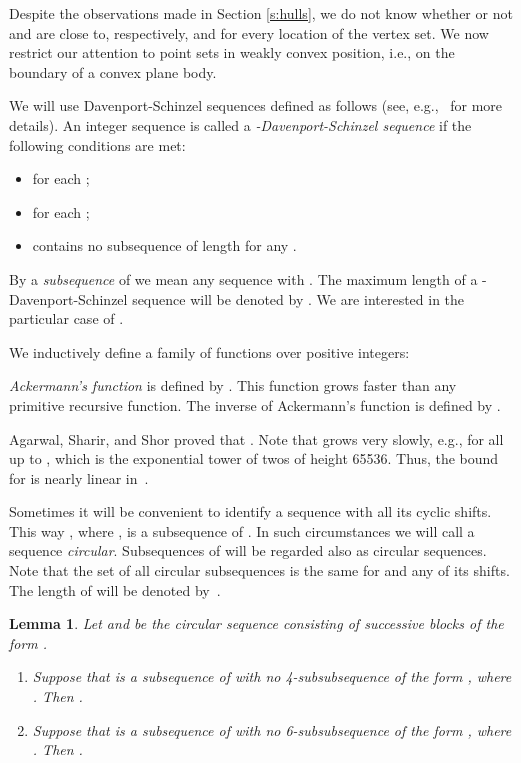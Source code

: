 \documentclass[reqno,12pt]{amsart}
\newtheorem{lemma}[theorem]{Lemma}
\newenvironment{bfenumerate}{\renewcommand{\labelenumi}{{\bf\theenumi.}}\renewcommand{\labelenumii}{{\bf(\theenumii)}}\begin{enumerate}}{\end{enumerate}}
\begin{document}
Despite the observations made in Section \ref{s:hulls}, we do not know
whether or not  and  are close to, respectively, 
 and  for every location  of the vertex set.
We now restrict our attention to point sets  in weakly convex position,
i.e., on the boundary of a convex plane body.

We will use Davenport-Schinzel sequences defined as follows 
(see, e.g.,~\cite{ASh} for more details).
An integer sequence  is called a \emph{-Davenport-Schinzel
sequence} if the following conditions are met:
\begin{itemize}
\item
 for each ;
\item
 for each ;
\item
 contains no subsequence  of length  for any .
\end{itemize}
By a \emph{subsequence} of  we mean any sequence 
with .
The maximum length of a -Davenport-Schinzel sequence will be denoted
by . We are interested in the particular case of .

We inductively define a family of functions over positive integers:

\emph{Ackermann's function} is defined by .
This function grows faster than any primitive recursive function.
The inverse of Ackermann's function is defined by
.

Agarwal, Sharir, and Shor \cite{ASS} proved that .
Note that  grows very slowly, e.g.,  for
all  up to , which is the exponential tower of twos of height 65536. 
Thus, the bound for  is nearly linear in~.

Sometimes it will be convenient to identify a sequence  with all 
its cyclic shifts. This way , where ,
is a subsequence of . In such circumstances
we will call a sequence \emph{circular}.
Subsequences of  will be
regarded also as circular sequences. Note that the set of all circular
subsequences is the same for  and any of its shifts.
The length of  will be denoted by~.


\begin{lemma}\label{lem:circle}
Let  and  be the circular sequence consisting of  successive
blocks of the form . 
\begin{bfenumerate}
\item
Suppose that  is a subsequence of  with no
4-subsubsequence of the form , where . Then .
\item
Suppose that  is a subsequence of  with no
6-subsubsequence of the form , where . Then 
.
\end{bfenumerate}
\end{lemma}
\end{document}
